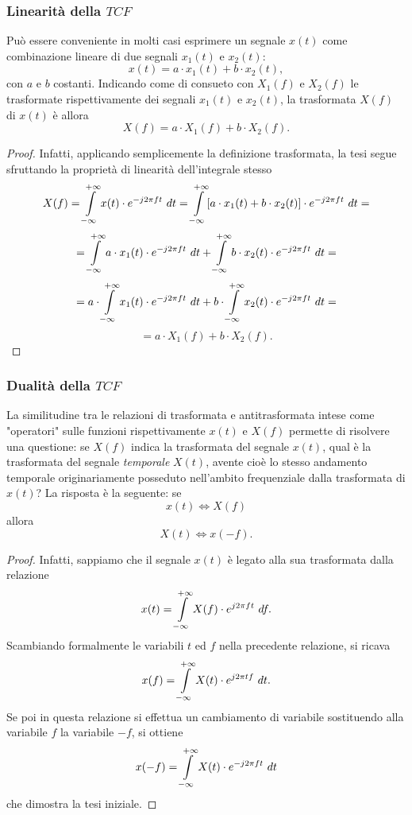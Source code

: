 \documentclass[12pt,oneside,openany]{memoir}
\numberwithin{equation}{subsection}
\newcommand{\dt}{\ dt}
\begin{document}
\subsubsection{Linearit\`a della $TCF$}
Pu\`o essere conveniente in molti casi esprimere un segnale $x(t)$ come
combinazione lineare di due segnali $x_1(t)$ e $x_2(t)$:
\[
	x(t) = a \cdot x_1(t) + b \cdot x_2(t),
\]
con $a$ e $b$ costanti. Indicando come di consueto con $X_1(f)$ e $X_2(f)$ le
trasformate rispettivamente dei segnali $x_1(t)$ e $x_2(t)$, la trasformata
$X(f)$ di $x(t)$ \`e allora
\[
	X(f) = a \cdot X_1(f) + b \cdot X_2(f).
\]
\begin{proof}
Infatti, applicando semplicemente la definizione trasformata, la tesi segue
sfruttando la propriet\`a di linearit\`a dell'integrale stesso
\[
	X(f) = \int\displaylimits_{-\infty}^{+\infty} x(t) \cdot
	e^{-j 2 \pi f t} \dt = \int\displaylimits_{-\infty}^{+\infty} [a 
	\cdot x_1(t) + b \cdot x_2(t)] \cdot e^{-j 2 \pi f t} \dt =
\]
\[
	= \int\displaylimits_{-\infty}^{+\infty} a \cdot x_1(t) \cdot 
	e^{-j 2 \pi f t} \dt + \int\displaylimits_{-\infty}^{+\infty} b 
	\cdot x_2(t) \cdot e^{-j 2 \pi f t} \dt =
\]
\[
	= a \cdot \int\displaylimits_{-\infty}^{+\infty} x_1(t) \cdot 
	e^{-j 2 \pi f t} \dt + b \cdot \int\displaylimits_{-\infty}^{+\infty} 
	x_2(t) \cdot e^{-j 2 \pi f t} \dt =
\]
\[
	= a \cdot X_1(f) + b \cdot X_2(f).
\]
\end{proof}


\newpage
\subsubsection{Dualit\`a della $TCF$}
La similitudine tra le relazioni di trasformata e antitrasformata intese come
"operatori" sulle funzioni rispettivamente $x(t)$ e $X(f)$ permette di risolvere
una questione: se $X(f)$ indica la trasformata del segnale $x(t)$, qual \`e la
trasformata del segnale \textit{temporale} $X(t)$, avente cio\`e lo stesso
andamento temporale originariamente posseduto nell'ambito frequenziale dalla
trasformata di $x(t)$? La risposta \`e la seguente: se
\[
	x(t) \iff X(f)
\]
allora
\[
	X(t) \iff x(-f).
\]
\begin{proof}
Infatti, sappiamo che il segnale $x(t)$ \`e legato alla sua trasformata dalla
relazione
\[
	x(t) = \int\displaylimits_{-\infty}^{+\infty} X(f) \cdot
    e^{j 2 \pi f t} \ df.
\]
Scambiando formalmente le variabili $t$ ed $f$ nella precedente relazione, si
ricava
\[
	x(f) = \int\displaylimits_{-\infty}^{+\infty} X(t) \cdot
    e^{j 2 \pi t f} \ dt.
\]
Se poi in questa relazione si effettua un cambiamento di variabile sostituendo
alla variabile $f$ la variabile $-f$, si ottiene
\[
	x(-f) = \int\displaylimits_{-\infty}^{+\infty} X(t) \cdot
    e^{-j 2 \pi f t} \dt
\]
che dimostra la tesi iniziale.
\end{proof}
\end{document}
